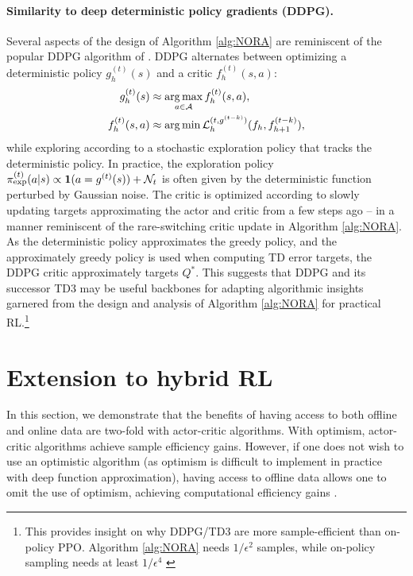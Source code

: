 \paragraph{Similarity to deep deterministic policy gradients (DDPG).} Several aspects of the design of Algorithm \ref{alg:NORA} are reminiscent of the popular DDPG algorithm of \citet{lillicrap2015continuous}. DDPG alternates between optimizing a deterministic policy $g_h^{(t)}(s)$ and a critic $f_h^{(t)}(s,a)$:
\begin{align}
    g_h^{(t)}(s) &\approx \operatorname*{arg\,max}_{a\in{\mathcal{A}}} f_h^{(t)}(s,a), \\
    f_h^{(t)}(s,a) &\approx \operatorname*{arg\,min} {\mathcal{L}}_h^{(t,g^{(t-k)})}(f_h,f_{h+1}^{(t-k)}),
    \label{eqn:ddpg}
\end{align}
while exploring according to a stochastic exploration policy that tracks the deterministic policy. In practice, the exploration policy $\pi_{\text{exp}}^{(t)}(a|s) \propto \mathbf{1}(a = g^{(t)}(s)) + {\mathcal{N}}_t$ is often given by the deterministic function perturbed by Gaussian noise. The critic is optimized according to slowly updating targets approximating the actor and critic from a few steps ago -- in a manner reminiscent of the rare-switching critic update in Algorithm \ref{alg:NORA}. As the deterministic policy approximates the greedy policy, and the approximately greedy policy is used when computing TD error targets, the DDPG critic approximately targets $Q^*$. This suggests that DDPG and its successor TD3 \citep{fujimoto2018addressing} may be useful backbones for adapting algorithmic insights garnered from the design and analysis of Algorithm \ref{alg:NORA} for practical RL.\footnote{This provides insight on why DDPG/TD3 are more sample-efficient than on-policy PPO. Algorithm \ref{alg:NORA} needs $1/\epsilon^2$ samples, while on-policy sampling needs at least $1/\epsilon^4$ \citep{liu2023optimistic}} 


\section{Extension to hybrid RL}
\label{sec:hybrid-rl}

In this section, we demonstrate that the benefits of having access to both offline and online data are two-fold with actor-critic algorithms. With optimism, actor-critic algorithms achieve sample efficiency gains. However, if one does not wish to use an optimistic algorithm (as optimism is difficult to implement in practice with deep function approximation), having access to offline data allows one to omit the use of optimism, achieving computational efficiency gains \citep[e.g.,][]{jin2021pessimism, li2024settling, rashidinejad2021bridging}. 

